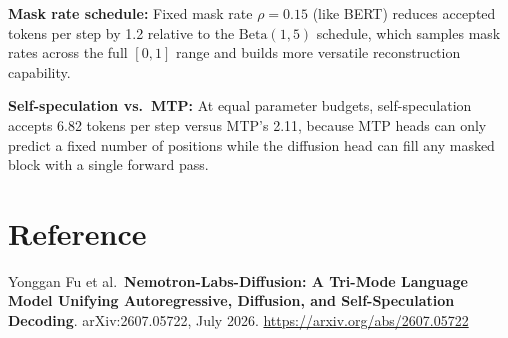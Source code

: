 \documentclass[10pt,twocolumn]{article}
\begin{document}
\textbf{Mask rate schedule:} Fixed mask rate $\rho = 0.15$ (like
BERT) reduces accepted tokens per step by 1.2 relative to the
$\text{Beta}(1, 5)$ schedule, which samples mask rates across the
full $[0, 1]$ range and builds more versatile reconstruction capability.

\textbf{Self-speculation vs.\ MTP:} At equal parameter budgets,
self-speculation accepts 6.82 tokens per step versus MTP's 2.11,
because MTP heads can only predict a fixed number of positions while
the diffusion head can fill any masked block with a single forward pass.

\section*{Reference}

Yonggan Fu et al.\
\textbf{Nemotron-Labs-Diffusion: A Tri-Mode Language Model Unifying
Autoregressive, Diffusion, and Self-Speculation Decoding}.
arXiv:2607.05722, July 2026.
\url{https://arxiv.org/abs/2607.05722}
\end{document}
